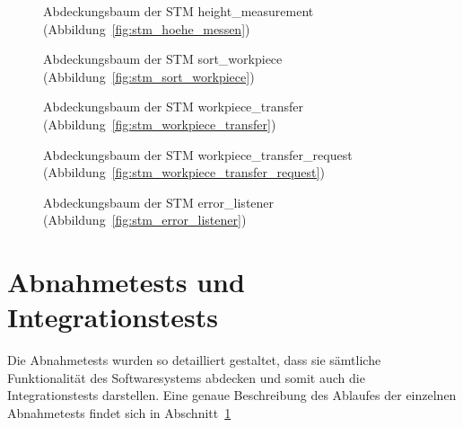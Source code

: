 \begin{figure}
    \caption{Abdeckungsbaum der STM height\_measurement
        (Abbildung~\ref{fig:stm_hoehe_messen})}
    \label{fig:tt_height_measurement}
\end{figure}

\begin{figure}
    \caption{Abdeckungsbaum der STM sort\_workpiece
        (Abbildung~\ref{fig:stm_sort_workpiece})}
    \label{fig:tt_sort_workpiece}
\end{figure}

\begin{figure}
    \caption{Abdeckungsbaum der STM workpiece\_transfer
        (Abbildung~\ref{fig:stm_workpiece_transfer})}
    \label{fig:tt_workpiece_transfer}
\end{figure}

\begin{figure}
    \caption{Abdeckungsbaum der STM workpiece\_transfer\_request
        (Abbildung~\ref{fig:stm_workpiece_transfer_request})}
    \label{fig:tt_workpiece_transfer_request}
\end{figure}

\begin{figure}
    \caption{Abdeckungsbaum der STM error\_listener
        (Abbildung~\ref{fig:stm_error_listener})}
    \label{fig:tt_error_listener}
\end{figure}


\FloatBarrier
\section{Abnahmetests und Integrationstests}\label{sec:abnahmetest}

%
Die Abnahmetests wurden so detailliert gestaltet,
dass sie sämtliche Funktionalität des Softwaresystems abdecken und somit auch die Integrationstests darstellen.
Eine genaue Beschreibung des Ablaufes der einzelnen Abnahmetests findet sich in Abschnitt~\ref{sec:abnahmetest}


